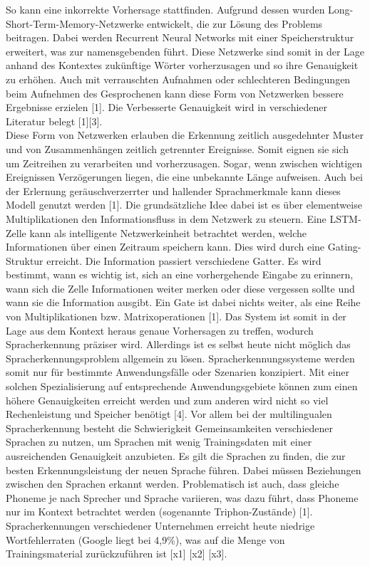 So kann eine inkorrekte Vorhersage stattfinden. Aufgrund dessen wurden Long-Short-Term-Memory-Netzwerke entwickelt, die zur Lösung des Problems beitragen. Dabei werden Recurrent Neural Networks mit einer Speicherstruktur erweitert, was zur namensgebenden führt. Diese Netzwerke sind somit in der Lage anhand des Kontextes zukünftige Wörter vorherzusagen und so ihre Genauigkeit zu erhöhen.  Auch mit verrauschten Aufnahmen oder schlechteren Bedingungen beim Aufnehmen des Gesprochenen kann diese Form von Netzwerken bessere Ergebnisse erzielen [1]. Die Verbesserte Genauigkeit wird in verschiedener Literatur belegt [1][3]. 
\\
Diese Form von Netzwerken erlauben die Erkennung zeitlich ausgedehnter Muster und von Zusammenhängen zeitlich getrennter Ereignisse. Somit eignen sie sich um Zeitreihen zu verarbeiten und vorherzusagen. Sogar, wenn zwischen wichtigen Ereignissen Verzögerungen liegen, die eine unbekannte Länge aufweisen. Auch bei der Erlernung geräuschverzerrter und hallender Sprachmerkmale kann dieses Modell genutzt werden [1]. 
Die grundsätzliche Idee dabei ist es über elementweise Multiplikationen den Informationsfluss in dem Netzwerk zu steuern. Eine LSTM-Zelle kann als intelligente Netzwerkeinheit betrachtet werden, welche Informationen über einen Zeitraum speichern kann. Dies wird durch eine Gating-Struktur erreicht. Die Information passiert verschiedene Gatter. Es wird bestimmt, wann es wichtig ist, sich an eine vorhergehende Eingabe zu erinnern, wann sich die Zelle Informationen weiter merken oder diese vergessen sollte und wann sie die Information ausgibt. Ein Gate ist dabei nichts weiter, als eine Reihe von Multiplikationen bzw. Matrixoperationen [1]. 
Das System ist somit in der Lage aus dem Kontext heraus genaue Vorhersagen zu treffen, wodurch Spracherkennung präziser wird. Allerdings ist es selbst heute nicht möglich das Spracherkennungsproblem allgemein zu lösen. Spracherkennungssysteme werden somit nur für bestimmte Anwendungsfälle oder Szenarien konzipiert. Mit einer solchen Spezialisierung auf entsprechende Anwendungsgebiete können zum einen höhere Genauigkeiten erreicht werden und zum anderen wird nicht so viel Rechenleistung und Speicher benötigt [4]. Vor allem bei der multilingualen Spracherkennung besteht die Schwierigkeit Gemeinsamkeiten verschiedener Sprachen zu nutzen, um Sprachen mit wenig Trainingsdaten mit einer ausreichenden Genauigkeit anzubieten. Es gilt die Sprachen zu finden, die zur besten Erkennungsleistung der neuen Sprache führen. Dabei müssen Beziehungen zwischen den Sprachen erkannt werden. Problematisch ist auch, dass gleiche Phoneme je nach Sprecher und Sprache variieren, was dazu führt, dass Phoneme nur im Kontext betrachtet werden (sogenannte Triphon-Zustände) [1]. Spracherkennungen verschiedener Unternehmen erreicht heute niedrige Wortfehlerraten (Google liegt bei 4,9\%), was auf die Menge von Trainingsmaterial zurückzuführen ist [x1] [x2] [x3]. 